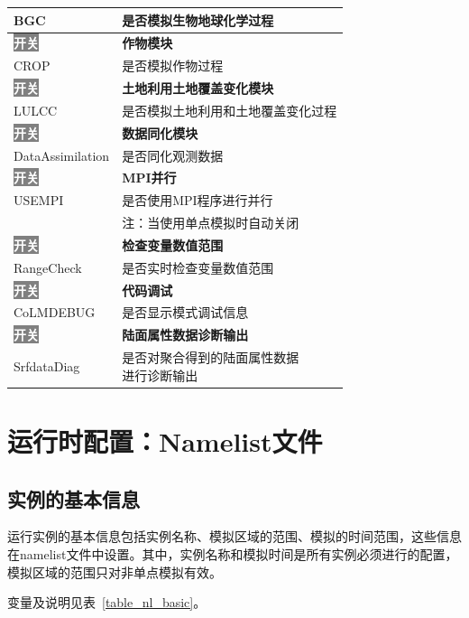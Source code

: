 \documentclass[a4paper,12pt,twoside]{article}
\begin{document}
{\begin{longtable}{ll}
BGC &  是否模拟生物地球化学过程 \\
\hline
\colorbox{gray}{\textcolor{white}{\bf{开关}}} & \bf{作物模块} \\
CROP &  是否模拟作物过程 \\
\hline
\colorbox{gray}{\textcolor{white}{\bf{开关}}} & \bf{土地利用土地覆盖变化模块} \\
LULCC &  是否模拟土地利用和土地覆盖变化过程 \\
\hline
\colorbox{gray}{\textcolor{white}{\bf{开关}}} & \bf{数据同化模块} \\
DataAssimilation &  是否同化观测数据 \\
\hline
\colorbox{gray}{\textcolor{white}{\bf{开关}}} & \bf{MPI并行} \\
USEMPI &  是否使用MPI程序进行并行 \\
 & 注：当使用单点模拟时自动关闭 \\
\hline
\colorbox{gray}{\textcolor{white}{\bf{开关}}} & \bf{检查变量数值范围} \\
RangeCheck &  是否实时检查变量数值范围 \\
\hline
\colorbox{gray}{\textcolor{white}{\bf{开关}}} & \bf{代码调试} \\
CoLMDEBUG &  是否显示模式调试信息 \\
\hline
\colorbox{gray}{\textcolor{white}{\bf{开关}}} & \bf{陆面属性数据诊断输出} \\
SrfdataDiag &  \makecell[l]{是否对聚合得到的陆面属性数据\\进行诊断输出} \\

\end{longtable}}

\section{运行时配置：Namelist文件}\label{nml}

\subsection{实例的基本信息}
运行实例的基本信息包括实例名称、模拟区域的范围、模拟的时间范围，这些信息在namelist文件中设置。其中，实例名称和模拟时间是所有实例必须进行的配置，模拟区域的范围只对非单点模拟有效。

变量及说明见表~\ref{table_nl_basic}。
\end{document}
